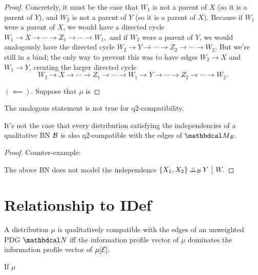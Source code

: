 \documentclass{article}
\newcommand{\CI}{\mathbin{\bot\!\!\!\bot}}
\begin{document}
\begin{proof}
        Concretely, it must be the case that $W_1$ is not a parent of $X$ (so it is a parent of $Y$), and $W_2$ is not a parent of $Y$ (so it is a parent of $X$). 
        Because if $W_1$ were a parent of $X$, we would have a directed cycle 
        $W_1 \to X \to\cdots\to Z_1 \to \cdots \to W_1,$ 
        and if $W_2$ were a parent of $Y$, we would analogously have the directed cycle 
        $W_2 \to Y \to\cdots\to Z_2 \to \cdots\to W_2$. 
        But we're still in a bind; the only way to prevent this was to have edges $W_2 \to X$ and $W_1 \to Y$, creating the larger directed cycle
        \[
            W_2 \to X \to\!\cdots\!\to Z_1 \to\!\cdots\!\to W_1 \to Y \to\!\cdots\!\to Z_2 \to\!\cdots\!\to W_2.
        \]
        

        
                
        $(\impliedby)$.
        Suppose that $\mu$ is 
        
        \TODO
        
    \end{proof}
    
    The analogous statement is not true for q2-compatibility.
    
    \begin{prop}
        It's not the case that every distribution satisfying the independencies of
        a qualitative BN $\cal B$ is also q2-compatible with the edges of $\PDGof{\cal B}$.
    \end{prop}
    \begin{proof}
        Counter-example:
        \begin{center}
        \end{center}
        The above BN does not model the independence
        \(
            \{X_1, X_2\} \CI_{\cal B} Y ~\big|~ W.
        \)
    \end{proof}
    
    \section{Relationship to IDef}
    \begin{conj}
        A distribution $\mu$ is qualitatively compatible with the edges of an unweighted PDG $\dg N$ iff 
        the information profile vector of $\mu$ dominates the information profile vector of $\mu[\mathcal E]$. 
    \end{conj}
    \begin{conj}
        If $\mu$ 
    \end{conj}
    
\end{document}
